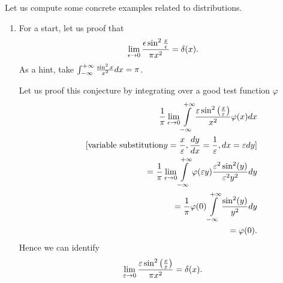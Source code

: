 {
\color{blue}
\bexample

Let us compute some concrete examples related to distributions.
\begin{enumerate}
\item
For a start, let us proof that
\begin{equation}
\lim_{\epsilon \rightarrow 0}{\epsilon \sin^2 \frac{x}{\epsilon}\over \pi
 x^2}= \delta (x).\end{equation}
As a hint, take  $\int_{-\infty}^{+\infty} {\sin^2x\over x^2}dx =\pi $.

Let us proof this conjecture by integrating over a good test function $\varphi$
\begin{equation}
\begin{split}
   {1\over\pi}\lim_{\epsilon \rightarrow 0}\int\limits_{-\infty}^{+\infty}
   {\varepsilon\sin^2\left({x\over\varepsilon}\right)\over x^2} \varphi(x) dx
\\
\qquad \textrm{[variable substitution}  y={x\over\varepsilon} , {dy\over dx}={1\over\varepsilon}, dx=\varepsilon dy
\textrm{]}
\\ \qquad =
  {1\over\pi}\lim_{\epsilon \rightarrow 0}
   \int\limits_{-\infty}^{+\infty}\varphi(\varepsilon y)
   {\varepsilon^2\sin^2(y)\over \varepsilon^2y^2}dy
\\ \qquad =    {1\over\pi}
   \varphi(0)\int\limits_{-\infty}^{+\infty}{\sin^2(y)\over y^2}dy
\\ \qquad =    \varphi(0).
\end{split}
\end{equation}
Hence we can identify
\begin{equation}
   \lim_{\varepsilon \rightarrow 0}{\varepsilon\sin^2 \left({x\over\varepsilon}\right)\over\pi x^2}=\delta(x).
\end{equation}


\end{enumerate}}
